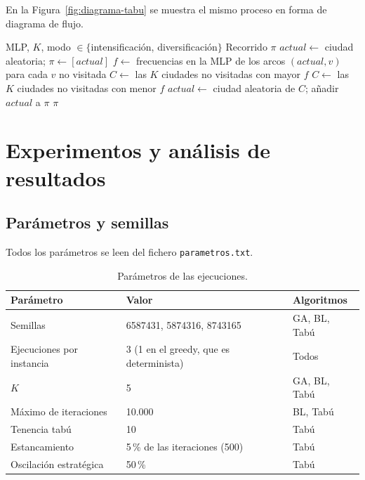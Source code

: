 En la Figura~\ref{fig:diagrama-tabu} se muestra el mismo proceso en forma de diagrama de flujo.



\begin{algorithm}[H]
\caption{Construcción de una solución a partir de la MLP (intensificación y diversificación)}
\begin{algorithmic}[1]
\Require MLP, $K$, modo $\in \{$intensificación, diversificación$\}$
\Ensure Recorrido $\pi$
\State $actual \gets$ ciudad aleatoria; \quad $\pi \gets [actual]$
    \State $f \gets$ frecuencias en la MLP de los arcos $(actual, v)$ para cada $v$ no visitada
        \State $C \gets$ las $K$ ciudades no visitadas con mayor $f$
    \Else
        \State $C \gets$ las $K$ ciudades no visitadas con menor $f$
    \EndIf
    \State $actual \gets$ ciudad aleatoria de $C$; \quad añadir $actual$ a $\pi$
\EndWhile
\State \Return $\pi$
\end{algorithmic}
\end{algorithm}

\section{Experimentos y análisis de resultados}

\subsection{Parámetros y semillas}

Todos los parámetros se leen del fichero \texttt{parametros.txt}.

\begin{table}[H]
\centering
\begin{tabular}{lll}
\toprule
Parámetro & Valor & Algoritmos \\
\midrule
Semillas & 6587431, 5874316, 8743165 & GA, BL, Tabú \\
Ejecuciones por instancia & 3 (1 en el greedy, que es determinista) & Todos \\
$K$ & 5 & GA, BL, Tabú \\
Máximo de iteraciones & 10.000 & BL, Tabú \\
Tenencia tabú & 10 & Tabú \\
Estancamiento & 5\,\% de las iteraciones (500) & Tabú \\
Oscilación estratégica & 50\,\% & Tabú \\
\bottomrule
\end{tabular}
\caption{Parámetros de las ejecuciones.}
\label{tab:parametros}
\end{table}


